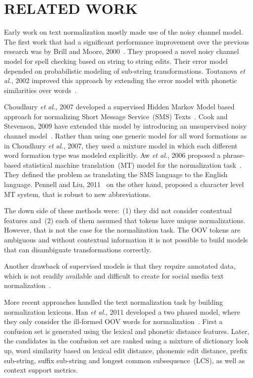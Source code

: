 \documentclass[a4paper,onesided,12pt]{report}
\begin{document}
\chapter{RELATED WORK}
\label{chapter:related}

Early work on text normalization mostly made use of the noisy channel model. The first work that had a significant performance improvement over the previous research was by Brill and Moore, 2000~\cite{Brill:2000:IEM:1075218.1075255}. They proposed a novel noisy channel model for spell checking based on string to string edits. Their error model depended on probabilistic modeling of sub-string transformations. Toutanova \textit{et al.}, 2002 improved this approach by extending the error model with phonetic similarities over words~\cite{Toutanova:2002:PMI:1073083.1073109}.

Choudhury \textit{et al.}, 2007 developed a supervised Hidden Markov Model based approach for normalizing Short Message Service~(SMS) Texts~\cite{Choudhury:2007:IMS:1326044.1326048}. Cook and Stevenson, 2009 have extended this model by introducing an unsupervised noisy channel model~\cite{Cook:2009:UMT:1642011.1642021}. Rather than using one generic model for all word formations as in Choudhury \textit{et al.}, 2007, they used a mixture model in which each different word formation type was modeled explicitly. Aw \textit{et al.}, 2006 proposed a phrase-based statistical machine translation~(MT) model for the normalization task~\cite{Aw:2006:PSM:1273073.1273078}. They defined the problem as translating the SMS language to the English language. Pennell and Liu, 2011~\cite{pennell2011character} on the other hand, proposed a character level MT system, that is robust to new abbreviations.

The down side of these methods were:~(1) they did not consider contextual features and~(2) each of them assumed that tokens have unique normalizations. However, that is not the case for the normalization task. The OOV tokens are ambiguous and without contextual information it is not possible to build models that can disambiguate transformations correctly.

Another drawback of supervised models is that they require annotated data, which is not readily available and difficult to create for social media text normalization~\cite{DBLP:conf/emnlp/YangE13}.

More recent approaches handled the text normalization task by building normalization lexicons. Han \textit{et al.}, 2011 developed a two phased model, where they only consider the ill-formed OOV words for normalization~\cite{Han:2011:LNS:2002472.2002520}. First a confusion set is generated using the lexical and phonetic distance features. Later, the candidates in the confusion set are ranked using a mixture of dictionary look up, word similarity based on lexical edit distance, phonemic edit distance, prefix sub-string, suffix sub-string and longest common subsequence~(LCS), as well as context support metrics.
\end{document}
